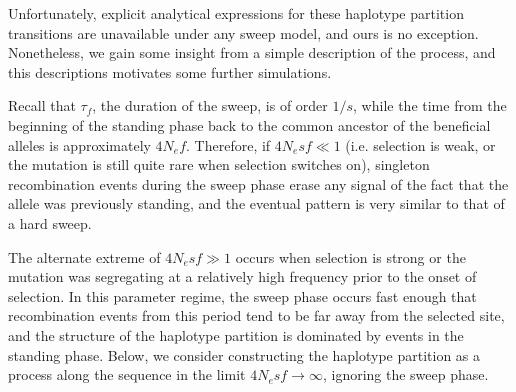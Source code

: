 \documentclass[a4paper,10pt]{article}
\begin{document}
Unfortunately, explicit analytical expressions for these haplotype partition transitions are unavailable under any sweep model, and ours is no exception. Nonetheless, we gain some insight from a simple description of the process, and this descriptions motivates some further simulations.

Recall that $\tau_{f}$, the duration of the sweep, is of order $1/s$, while the time from the beginning of the standing phase back to the common ancestor of the beneficial alleles is approximately $4N_e f$. Therefore, if $4N_e s f \ll 1$ (i.e. selection is weak, or the mutation is still quite rare when selection switches on), singleton recombination events during the sweep phase erase any signal of the fact that the allele was previously standing, and the eventual pattern is very similar to that of a hard sweep.

The alternate extreme of $4N_e s f \gg 1$ occurs when selection is strong or the mutation was segregating at a relatively high frequency prior to the onset of selection. In this parameter regime, the sweep phase occurs fast enough that recombination events from this period tend to be far away from the selected site, and the structure of the haplotype partition is dominated by events in the standing phase. Below, we consider constructing the haplotype partition as a process along the sequence in the limit $4N_e s f \rightarrow \infty$, ignoring the sweep phase.
\end{document}
